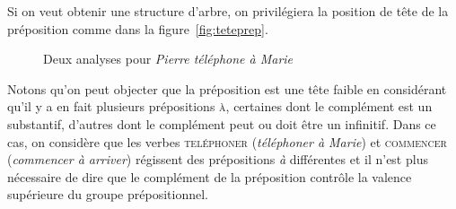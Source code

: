 Si on veut obtenir une structure d'arbre, on privilégiera la position de tête de la préposition comme dans la figure~\ref{fig:teteprep}.

\begin{figure}
\hbox{}\hfill
\hfill
  \hfill\hbox{}
\caption{Deux analyses pour \textit{Pierre téléphone à Marie}\label{fig:teteprep}\label{fig:tetefaible}}
\end{figure}

Notons qu'on peut objecter que la préposition est une tête faible en considérant qu'il y a en fait  plusieurs prépositions \textsc{à}, certaines dont le complément est un substantif, d'autres dont le complément peut ou doit être un infinitif. Dans ce cas, on considère que les verbes \textsc{teléphoner} (\textit{téléphoner à Marie}) et \textsc{commencer} (\textit{commencer à arriver}) régissent des prépositions \textit{à} différentes et il n’est plus nécessaire de dire que le complément de la préposition contrôle la valence supérieure du groupe prépositionnel.


